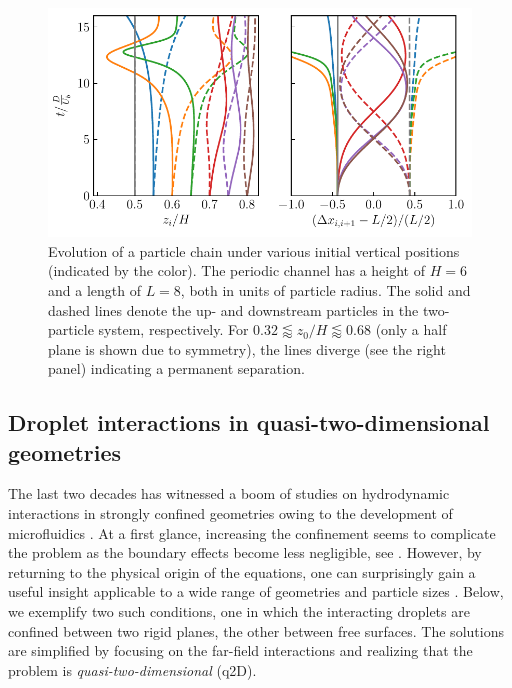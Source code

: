 \begin{figure}%
  \centering
  \includegraphics[width=0.9\columnwidth]{H3.pdf}
  \caption{Evolution of a particle chain under various initial vertical positions (indicated by the color). The periodic channel has a height of $H=6$ and a length of $L=8$, both in units of particle radius. The solid and dashed lines denote the up- and downstream particles in the two-particle system, respectively. For $0.32 \lessapprox z_0/H \lessapprox 0.68$ (only a half plane is shown due to symmetry), the lines diverge (see the right panel) indicating a permanent separation.}
  \label{fig:xover}
\end{figure}



\subsection{Droplet interactions in quasi-two-dimensional geometries}
\label{subsec:drop-confined}

The last two decades has witnessed a boom of studies on hydrodynamic interactions in strongly confined geometries owing to the development of microfluidics \citep{Cui_etal_2002, Cui2004, tlusty, Davit_2008, q2d_Beatus}.
At a first glance, increasing the confinement seems to complicate the problem as the boundary effects become less negligible, see \eg \cite{LironMochon, Fouxon_Rubinstein2019}.
However, by returning to the physical origin of the equations, one can surprisingly gain a useful insight applicable to a wide range of geometries and particle sizes \citep{Diamant_2005}. Below, we exemplify two such conditions, one in which the interacting droplets are confined between two rigid planes, the other between free surfaces. The solutions are simplified by focusing on the far-field interactions and realizing that the problem is \emph{quasi-two-dimensional} (q2D). 

